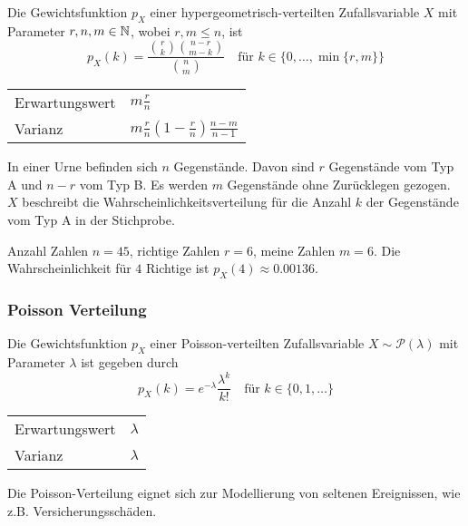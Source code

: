 Die Gewichtsfunktion \(p_X\) einer hypergeometrisch-verteilten Zufallsvariable \(X\) mit Parameter \(r,n,m \in \mathbb{N}\), wobei \(r,m \leq n\), ist
\[
	p_X(k) = \frac{{r \choose k}{{n-r} \choose {m-k}}}{{n \choose m}}
	\quad
	\text{für } k \in \{0,\ldots,\min\{r,m\}\}
\]

\begin{highlight}
	\begin{tabular}{l@{ : }l}
		Erwartungswert & \(m\frac{r}{n}\)                               \\
		Varianz        & \(m\frac{r}{n}(1-\frac{r}{n})\frac{n-m}{n-1}\)
	\end{tabular}
\end{highlight}

In einer Urne befinden sich \(n\) Gegenstände. Davon sind \(r\) Gegenstände vom Typ A und \(n-r\) vom Typ B. Es werden \(m\) Gegenstände ohne Zurücklegen gezogen. \(X\) beschreibt die Wahrscheinlichkeitsverteilung für die Anzahl \(k\) der Gegenstände vom Typ A in der Stichprobe.

\begin{example}[Lotto]
	Anzahl Zahlen \(n=45\), richtige Zahlen \(r=6\), meine Zahlen \(m=6\). Die Wahrscheinlichkeit für \(4\) Richtige ist
	\(		p_X(4) \approx 0.00136.	\)
\end{example}




\subsubsection{Poisson Verteilung}
Die Gewichtsfunktion \(p_X\) einer Poisson-verteilten Zufallsvariable \(X \sim \mathcal{P}(\lambda)\) mit Parameter \(\lambda\) ist gegeben durch
\[
	p_X(k) = e^{-\lambda}\frac{\lambda^k}{k!}
	\quad
	\text{für } k \in \{0,1,\ldots\}
\]


\begin{highlight}
	\begin{tabular}{l@{ : }l}
		Erwartungswert & \(\lambda\) \\
		Varianz        & \(\lambda\)
	\end{tabular}
\end{highlight}


Die Poisson-Verteilung eignet sich zur Modellierung von seltenen Ereignissen, wie z.B. Versicherungsschäden.

